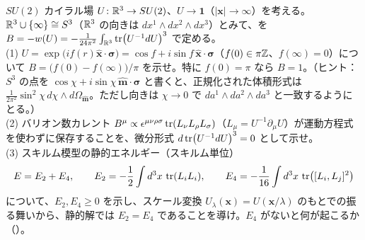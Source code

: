 \begin{problem}[難易度 D]\label{ch03-prob-skyrmion}
$SU(2)$ カイラル場 $U\colon\mathbb{R}^3\to SU(2)$、$U\to\mathbf 1$（$\lvert\bm x\rvert\to\infty$）を考える。$\mathbb{R}^3\cup\{\infty\}\cong S^3$（$\mathbb{R}^3$ の向きは $dx^1\wedge dx^2\wedge dx^3$）とみて、を $B=-w(U)=-\frac{1}{24\pi^2}\int_{\mathbb{R}^3}\tr(U^{-1}dU)^3$ で定める。\\
(1)  $U=\exp\bigl(if(r)\hat{\bm x}\cdot\bm\sigma\bigr)=\cos f+i\sin f\,\hat{\bm x}\cdot\bm\sigma$（$f(0)\in\pi\mathbb{Z}$、$f(\infty)=0$）について $B=\bigl(f(0)-f(\infty)\bigr)/\pi$ を示せ。特に $f(0)=\pi$ なら $B=1$。（ヒント：$S^3$ の点を $\cos\chi+i\sin\chi\,\hat{\bm m}\cdot\bm\sigma$ と書くと、正規化された体積形式は $\frac{1}{2\pi^2}\sin^2\chi\,d\chi\wedge d\Omega_{\hat{\bm m}}$。ただし向きは $\chi\to0$ で $da^1\wedge da^2\wedge da^3$ と一致するようにとる。）\\
(2) バリオン数カレント $B^\mu\propto\epsilon^{\mu\nu\rho\sigma}\tr(L_\nu L_\rho L_\sigma)$（$L_\mu=U^{-1}\partial_\mu U$）が運動方程式を使わずに保存することを、微分形式 $d\tr(U^{-1}dU)^3=0$ として示せ。\\
(3) スキルム模型の静的エネルギー（スキルム単位）
\[
E=E_2+E_4,\qquad E_2=-\frac12\int d^3x\,\tr(L_iL_i),\qquad E_4=-\frac1{16}\int d^3x\,\tr\bigl([L_i,L_j]^2\bigr)
\]
について、$E_2,E_4\ge0$ を示し、スケール変換 $U_\lambda(\bm x)=U(\bm x/\lambda)$ のもとでの振る舞いから、静的解では $E_2=E_4$ であることを導け。$E_4$ がないと何が起こるか（）。
\end{problem}

